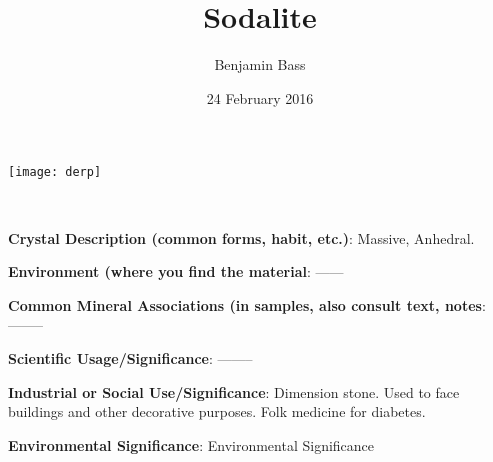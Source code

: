 \documentclass[10pt]{article}
\author{Benjamin Bass}
\date{24 February 2016}
\title{\vspace{-2.0cm}Sodalite} %
\begin{document}
\maketitle


\begin{center}
\texttt{[image: derp]}  
\end{center}

\
\
\
\
\
\
\
\
\
\

\begin{framed}
  \textbf{Crystal Description (common forms, habit, etc.)}:  Massive, Anhedral.
\end{framed}

\begin{framed}
  \textbf{Environment (where you find the material}:  ------
\end{framed}


\begin{framed}
  \textbf{Common Mineral Associations (in samples, also consult text, notes}:  --------
\end{framed}

\begin{framed}
  \textbf{Scientific Usage/Significance}:  --------
\end{framed}

\begin{framed}
  \textbf{Industrial or Social Use/Significance}:  Dimension stone. Used to face
buildings and other decorative purposes. Folk medicine for diabetes.
\end{framed}

\begin{framed}
  \textbf{Environmental Significance}:  Environmental Significance
\end{framed}


\end{document}
